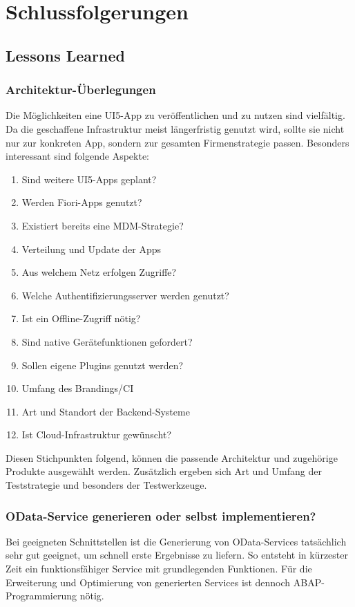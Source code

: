 \chapter{Schlussfolgerungen}
\label{cha:Schlussfolgerungen}

\section{Lessons Learned}

\subsection{Architektur-Überlegungen}
Die Möglichkeiten eine UI5-App zu veröffentlichen und zu nutzen sind vielfältig. Da die geschaffene Infrastruktur meist längerfristig genutzt wird, sollte sie nicht nur zur konkreten App, sondern zur gesamten Firmenstrategie passen. Besonders interessant sind folgende Aspekte:

\begin{enumerate}
	\item Sind weitere UI5-Apps geplant?
	\item Werden Fiori-Apps genutzt?
	\item Existiert bereits eine MDM-Strategie?
	\item Verteilung und Update der Apps
	\item Aus welchem Netz erfolgen Zugriffe?
	\item Welche Authentifizierungsserver werden genutzt?
	\item Ist ein Offline-Zugriff nötig?
	\item Sind native Gerätefunktionen gefordert?
	\item Sollen eigene Plugins genutzt werden?
	\item Umfang des Brandings/CI
	\item Art und Standort der Backend-Systeme
	\item Ist Cloud-Infrastruktur gewünscht?
\end{enumerate}	
Diesen Stichpunkten folgend, können die passende Architektur und zugehörige Produkte ausgewählt werden. Zusätzlich ergeben sich Art und Umfang der Teststrategie und besonders der Testwerkzeuge.

\subsection{OData-Service generieren oder selbst implementieren?}
Bei geeigneten Schnittstellen ist die Generierung von OData-Services tatsächlich sehr gut geeignet, um schnell erste Ergebnisse zu liefern. So entsteht in kürzester Zeit ein funktionsfähiger Service mit grundlegenden Funktionen. Für die Erweiterung und Optimierung von generierten Services ist dennoch ABAP-Programmierung nötig. 


